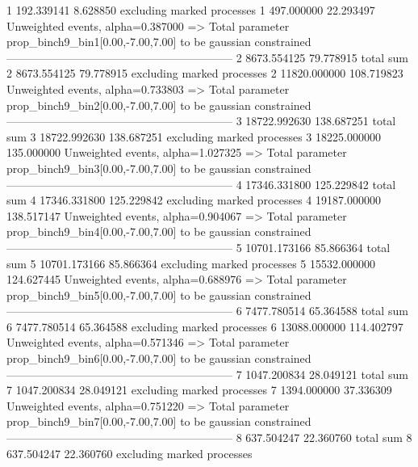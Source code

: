 1          192.339141      8.628850        excluding marked processes    
1          497.000000      22.293497       Unweighted events, alpha=0.387000
  => Total parameter prop_binch9_bin1[0.00,-7.00,7.00] to be gaussian constrained
------------------------------------------------------------
2          8673.554125     79.778915       total sum                     
2          8673.554125     79.778915       excluding marked processes    
2          11820.000000    108.719823      Unweighted events, alpha=0.733803
  => Total parameter prop_binch9_bin2[0.00,-7.00,7.00] to be gaussian constrained
------------------------------------------------------------
3          18722.992630    138.687251      total sum                     
3          18722.992630    138.687251      excluding marked processes    
3          18225.000000    135.000000      Unweighted events, alpha=1.027325
  => Total parameter prop_binch9_bin3[0.00,-7.00,7.00] to be gaussian constrained
------------------------------------------------------------
4          17346.331800    125.229842      total sum                     
4          17346.331800    125.229842      excluding marked processes    
4          19187.000000    138.517147      Unweighted events, alpha=0.904067
  => Total parameter prop_binch9_bin4[0.00,-7.00,7.00] to be gaussian constrained
------------------------------------------------------------
5          10701.173166    85.866364       total sum                     
5          10701.173166    85.866364       excluding marked processes    
5          15532.000000    124.627445      Unweighted events, alpha=0.688976
  => Total parameter prop_binch9_bin5[0.00,-7.00,7.00] to be gaussian constrained
------------------------------------------------------------
6          7477.780514     65.364588       total sum                     
6          7477.780514     65.364588       excluding marked processes    
6          13088.000000    114.402797      Unweighted events, alpha=0.571346
  => Total parameter prop_binch9_bin6[0.00,-7.00,7.00] to be gaussian constrained
------------------------------------------------------------
7          1047.200834     28.049121       total sum                     
7          1047.200834     28.049121       excluding marked processes    
7          1394.000000     37.336309       Unweighted events, alpha=0.751220
  => Total parameter prop_binch9_bin7[0.00,-7.00,7.00] to be gaussian constrained
------------------------------------------------------------
8          637.504247      22.360760       total sum                     
8          637.504247      22.360760       excluding marked processes    
